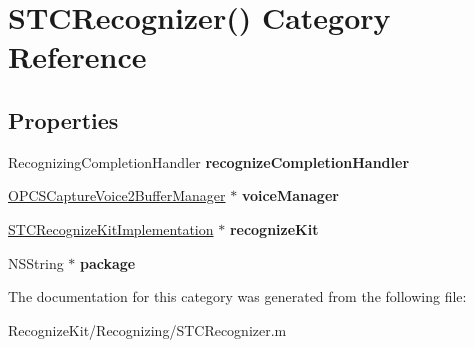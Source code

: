 \hypertarget{category_s_t_c_recognizer_07_08}{}\section{S\+T\+C\+Recognizer() Category Reference}
\label{category_s_t_c_recognizer_07_08}
\subsection*{Properties}
\begin{DoxyCompactItemize}
\item 
\hypertarget{category_s_t_c_recognizer_07_08_a745e4828b4ce638f3d5856199390bd83}{}\label{category_s_t_c_recognizer_07_08_a745e4828b4ce638f3d5856199390bd83} 
Recognizing\+Completion\+Handler {\bfseries recognize\+Completion\+Handler}
\item 
\hypertarget{category_s_t_c_recognizer_07_08_a9084c54563bfc4b9cf4dbe3dc3c4d02f}{}\label{category_s_t_c_recognizer_07_08_a9084c54563bfc4b9cf4dbe3dc3c4d02f} 
\hyperlink{interface_o_p_c_s_capture_voice2_buffer_manager}{O\+P\+C\+S\+Capture\+Voice2\+Buffer\+Manager} $\ast$ {\bfseries voice\+Manager}
\item 
\hypertarget{category_s_t_c_recognizer_07_08_aa5b59523827f85cfaf61d79dd80209be}{}\label{category_s_t_c_recognizer_07_08_aa5b59523827f85cfaf61d79dd80209be} 
\hyperlink{interface_s_t_c_recognize_kit_implementation}{S\+T\+C\+Recognize\+Kit\+Implementation} $\ast$ {\bfseries recognize\+Kit}
\item 
\hypertarget{category_s_t_c_recognizer_07_08_ad0b9592c3ae0914b4044aca646b91a96}{}\label{category_s_t_c_recognizer_07_08_ad0b9592c3ae0914b4044aca646b91a96} 
N\+S\+String $\ast$ {\bfseries package}
\end{DoxyCompactItemize}


The documentation for this category was generated from the following file\+:\begin{DoxyCompactItemize}
\item 
Recognize\+Kit/\+Recognizing/S\+T\+C\+Recognizer.\+m\end{DoxyCompactItemize}

